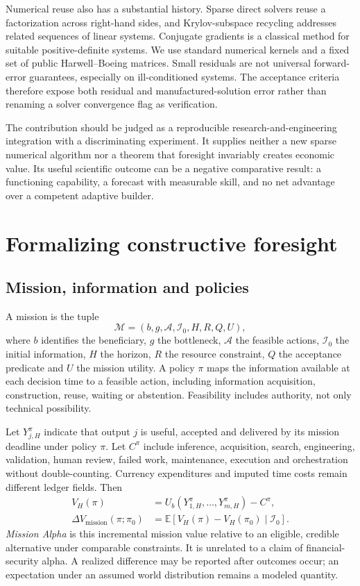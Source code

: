\documentclass[11pt,a4paper]{article}
\newcommand{\MA}{\ensuremath{\Delta V_{\mathrm{mission}}}}
\begin{document}
Numerical reuse also has a substantial history. Sparse direct solvers reuse a factorization across right-hand sides, and Krylov-subspace recycling addresses related sequences of linear systems. \citep{davis2011,parks2006} Conjugate gradients is a classical method for suitable positive-definite systems. \citep{hestenes1952} We use standard numerical kernels and a fixed set of public Harwell--Boeing matrices. Small residuals are not universal forward-error guarantees, especially on ill-conditioned systems. \citep{higham2002} The acceptance criteria therefore expose both residual and manufactured-solution error rather than renaming a solver convergence flag as verification.

The contribution should be judged as a reproducible research-and-engineering integration with a discriminating experiment. It supplies neither a new sparse numerical algorithm nor a theorem that foresight invariably creates economic value. Its useful scientific outcome can be a negative comparative result: a functioning capability, a forecast with measurable skill, and no net advantage over a competent adaptive builder.

\section{Formalizing constructive foresight}
\subsection{Mission, information and policies}
A mission is the tuple
\begin{equation}
\mathcal M=(b,g,\mathcal A,\mathcal I_0,H,R,Q,U),
\end{equation}
where $b$ identifies the beneficiary, $g$ the bottleneck, $\mathcal A$ the feasible actions, $\mathcal I_0$ the initial information, $H$ the horizon, $R$ the resource constraint, $Q$ the acceptance predicate and $U$ the mission utility. A policy $\pi$ maps the information available at each decision time to a feasible action, including information acquisition, construction, reuse, waiting or abstention. Feasibility includes authority, not only technical possibility.

Let $Y^\pi_{j,H}$ indicate that output $j$ is useful, accepted and delivered by its mission deadline under policy $\pi$. Let $C^\pi$ include inference, acquisition, search, engineering, validation, human review, failed work, maintenance, execution and orchestration without double-counting. Currency expenditures and imputed time costs remain different ledger fields. Then
\begin{align}
V_H(\pi)&=U_b(Y^\pi_{1,H},\ldots,Y^\pi_{m,H})-C^\pi,\\
\MA(\pi;\pi_0)&=\mathbb E[V_H(\pi)-V_H(\pi_0)\mid\mathcal I_0].
\end{align}
\emph{Mission Alpha} is this incremental mission value relative to an eligible, credible alternative under comparable constraints. It is unrelated to a claim of financial-security alpha. A realized difference may be reported after outcomes occur; an expectation under an assumed world distribution remains a modeled quantity.
\end{document}
